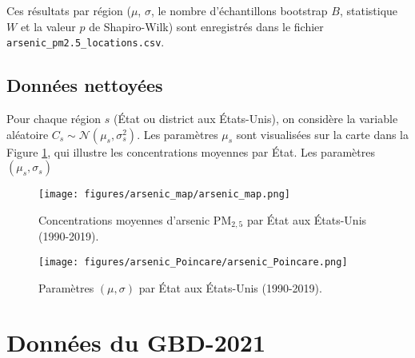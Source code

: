 Ces résultats par région ($\mu$, $\sigma$, le nombre d'échantillons bootstrap $B$, statistique $W$ et la valeur $p$ de Shapiro-Wilk) sont enregistrés dans le fichier \texttt{arsenic\_pm2.5\_locations.csv}.

\subsection{Données nettoyées}

Pour chaque région $s$ (État ou district aux États-Unis), on considère la variable aléatoire $C_s \sim \mathcal{N}\left(\mu_s, \sigma_s^2 \right)$. Les paramètres $\mu_s$ sont visualisées sur la carte dans la Figure \ref{fig:arsenic-map}, qui illustre les concentrations moyennes par État. Les paramètres $\left(\mu_s, \sigma_s\right)$ 

\begin{figure}[H]
	\centering
	\texttt{[image: figures/arsenic\_map/arsenic\_map.png]}
	\caption{Concentrations moyennes d'arsenic PM$_{2{,}5}$ par État aux États-Unis (1990-2019).}
	\label{fig:arsenic-map}
\end{figure}

\begin{figure}[H]
	\centering
	\texttt{[image: figures/arsenic\_Poincare/arsenic\_Poincare.png]}
	\caption{Paramètres $(\mu, \sigma)$ par État aux États-Unis (1990-2019).}
	\label{fig:arsenic_Poincare}
\end{figure}

\section{Données du GBD-2021}
